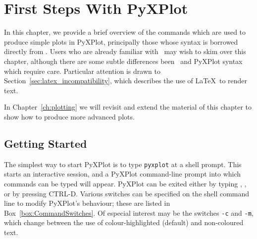 %
%
%
%
%



\chapter{First Steps With PyXPlot}
\label{ch:first_steps}

In this chapter, we provide a brief overview of the commands which are used to
produce simple plots in PyXPlot, principally those whose syntax is borrowed
directly from \gnuplot. Users who are already familiar with \gnuplot\ may wish
to skim over this chapter, although there are some subtle differences been
\gnuplot\ and PyXPlot syntax which require care. Particular attention is drawn
to Section~\ref{sec:latex_incompatibility}, which describes the use of \LaTeX\
to render text.

In Chapter~\ref{ch:plotting} we will revisit and extend the material of this
chapter to show how to produce more advanced plots.

\section{Getting Started}

The simplest way to start PyXPlot is to type {\tt pyxplot} at a shell prompt.
This starts an interactive session, and a PyXPlot command-line prompt into
which commands can be typed will appear. PyXPlot can be exited either by typing
\indcmdts{exit}, \indcmdts{quit}, or by pressing CTRL-D. Various switches can
be specified on the shell command line to modify PyXPlot's behaviour; these are
listed in Box~\ref{box:CommandSwitches}.  Of especial interest may be the
switches {\tt -c} and {\tt -m}, which change between the use of
colour-highlighted (default) and non-coloured text.

